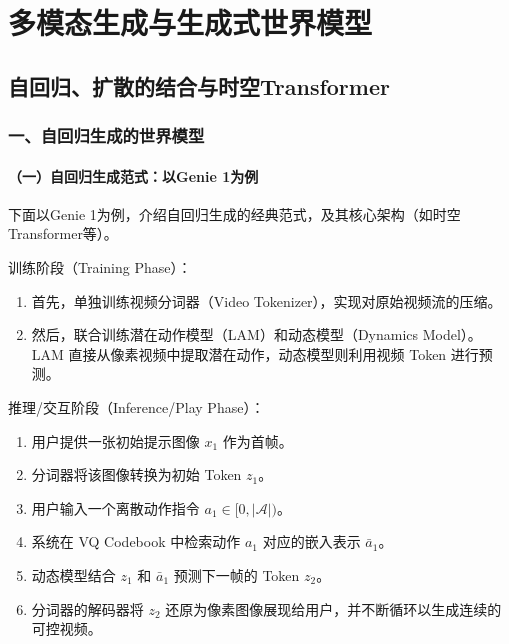 \hypertarget{ux591aux6a21ux6001ux751fux6210ux4e0eux751fux6210ux5f0fux4e16ux754cux6a21ux578b}{%
\chapter{多模态生成与生成式世界模型}\label{ux591aux6a21ux6001ux751fux6210ux4e0eux751fux6210ux5f0fux4e16ux754cux6a21ux578b}}

\hypertarget{ux81eaux56deux5f52ux6269ux6563ux7684ux7ed3ux5408ux4e0eux65f6ux7a7atransformer}{%
\section{自回归、扩散的结合与时空Transformer}\label{ux81eaux56deux5f52ux6269ux6563ux7684ux7ed3ux5408ux4e0eux65f6ux7a7atransformer}}

\hypertarget{ux4e00ux81eaux56deux5f52ux751fux6210ux7684ux4e16ux754cux6a21ux578b}{%
\subsection{一、自回归生成的世界模型}\label{ux4e00ux81eaux56deux5f52ux751fux6210ux7684ux4e16ux754cux6a21ux578b}}

\hypertarget{ux4e00ux81eaux56deux5f52ux751fux6210ux8303ux5f0fux4ee5genie-1ux4e3aux4f8b}{%
\subsubsection{（一）自回归生成范式：以Genie 1为例}\label{ux4e00ux81eaux56deux5f52ux751fux6210ux8303ux5f0fux4ee5genie-1ux4e3aux4f8b}}

下面以Genie 1为例，介绍自回归生成的经典范式，及其核心架构（如时空Transformer等）。

训练阶段（Training Phase）：

\begin{enumerate}
\def\labelenumi{\arabic{enumi}.}
\item
  首先，单独训练视频分词器（Video Tokenizer），实现对原始视频流的压缩。
\item
  然后，联合训练潜在动作模型（LAM）和动态模型（Dynamics Model）。LAM 直接从像素视频中提取潜在动作，动态模型则利用视频 Token 进行预测。
\end{enumerate}

推理/交互阶段（Inference/Play Phase）：

\begin{enumerate}
\def\labelenumi{\arabic{enumi}.}
\item
  用户提供一张初始提示图像 \(x_1\) 作为首帧。
\item
  分词器将该图像转换为初始 Token \(z_1\)。
\item
  用户输入一个离散动作指令 \(a_1\in[0,|\mathcal{A}|)\)。
\item
  系统在 VQ Codebook 中检索动作 \(a_1\) 对应的嵌入表示 \(\bar{a}_1\)。
\item
  动态模型结合 \(z_1\) 和 \(\bar{a}_1\) 预测下一帧的 Token \(z_2\)。
\item
  分词器的解码器将 \(z_2\) 还原为像素图像展现给用户，并不断循环以生成连续的可控视频。
\end{enumerate}


